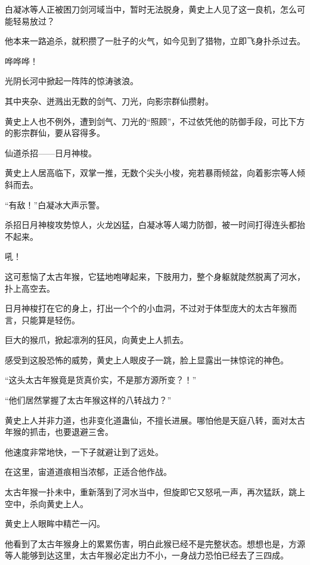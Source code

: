 
\begin{this_body}



白凝冰等人正被困刀剑河域当中，暂时无法脱身，黄史上人见了这一良机，怎么可能轻易放过？

他本来一路追杀，就积攒了一肚子的火气，如今见到了猎物，立即飞身扑杀过去。

哗哗哗！

光阴长河中掀起一阵阵的惊涛骇浪。

其中夹杂、迸溅出无数的剑气、刀光，向影宗群仙攒射。

黄史上人也不例外，遭到剑气、刀光的“照顾”，不过依凭他的防御手段，可比下方的影宗群仙，要从容得多。

仙道杀招——日月神梭。

黄史上人居高临下，双掌一推，无数个尖头小梭，宛若暴雨倾盆，向着影宗等人倾斜而去。

“有敌！”白凝冰大声示警。

杀招日月神梭攻势惊人，火龙凶猛，白凝冰等人竭力防御，被一时间打得连头都抬不起来。

吼！

这可惹恼了太古年猴，它猛地咆哮起来，下肢用力，整个身躯就陡然脱离了河水，扑上高空去。

日月神梭打在它的身上，打出一个个的小血洞，不过对于体型庞大的太古年猴而言，只能算是轻伤。

巨大的猴爪，掀起凛冽的狂风，向黄史上人抓去。

感受到这股恐怖的威势，黄史上人眼皮子一跳，脸上显露出一抹惊诧的神色。

“这头太古年猴竟是货真价实，不是那方源所变？！”

“他们居然掌握了太古年猴这样的八转战力？”

黄史上人并非力道，也非变化道蛊仙，不擅长进展。哪怕他是天庭八转，面对太古年猴的抓击，也要退避三舍。

他速度非常地快，一下子就避让到了远处。

在这里，宙道道痕相当浓郁，正适合他作战。

太古年猴一扑未中，重新落到了河水当中，但旋即它又怒吼一声，再次猛跃，跳上空中，杀向黄史上人。

黄史上人眼眸中精芒一闪。

他看到了太古年猴身上的累累伤害，明白此猴已经不是完整状态。想想也是，方源等人能够到达这里，太古年猴必定出力不小，一身战力恐怕已经去了三四成。


\end{this_body}

